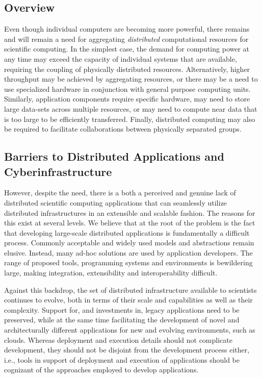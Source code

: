 \documentclass[a4paper,10pt]{article}
\begin{document}
\subsection{Overview}


Even though individual computers are becoming more powerful, there
remains and will remain a need for aggregating {\em distributed}
computational resources for scientific computing. In the simplest
case, the demand for computing power at any time may exceed
the capacity of individual systems that are available, requiring the coupling
of physically distributed resources.  Alternatively, higher throughput
may be achieved by aggregating resources, or there may be a need to use
specialized hardware in conjunction with general purpose computing
units.  Similarly, application components require specific hardware,
may need to store large data-sets across multiple resources, or may need to
compute near data that is too large to be efficiently transferred.  Finally,
distributed computing may also be required to facilitate collaborations
between physically separated groups.

\subsection{Barriers to Distributed Applications and
  Cyberinfrastructure} 

However, despite the need, there is a both a perceived and genuine
lack of distributed scientific computing applications that can
seamlessly utilize distributed infrastructures in an extensible and
scalable fashion.  The reasons for this exist at several levels.  We
believe that at the root of the problem is the fact that developing
large-scale distributed applications is fundamentally a difficult
process.  Commonly acceptable and widely used models and abstractions
remain elusive. Instead, many ad-hoc solutions are used by application
developers.  The range of proposed tools, programming systems and
environments is bewildering large, making integration, extensibility
and interoperability difficult.

Against this backdrop, the set of distributed infrastructure available
to scientists continues to evolve, both in terms of their scale and
capabilities as well as their complexity.  Support for, and
investments in, legacy applications need to be preserved, while at the
same time facilitating the development of novel and architecturally
different applications for new and evolving environments, such as
clouds. Whereas deployment and execution details should not complicate
development, they should not be disjoint from the development process
either, i.e., tools in support of deployment and execution of
applications should be cognizant of the approaches employed to develop
applications.
\end{document}
